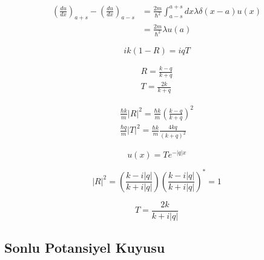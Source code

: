 \documentclass[a4paper,12pt, twoside]{article}
\begin{document}
\begin{equation}
\begin{aligned} \left( \frac { d u } { d x } \right) _ { a + s } - \left( \frac { d u } { d x } \right) _ { a - s } & = \frac { 2 m } { \hbar ^ { 2 } } \int _ { a - s } ^ { a + s } d x \lambda \delta ( x - a ) u ( x ) \\ & = \frac { 2 m } { \hbar ^ { 2 } } \lambda u ( a ) \end{aligned}
\end{equation}


\begin{equation}
i k ( 1 - R ) = i q T
\end{equation}


\begin{equation}
\begin{array} { l } { R = \frac { k - q } { k + q } } \\ { T = \frac { 2 k } { k + q } } \end{array}
\end{equation}


\begin{equation}
\begin{array} { l } { \frac { \hbar k } { m } | R | ^ { 2 } = \frac { \hbar k } { m } \left( \frac { k - q } { k + q } \right) ^ { 2 } } \\ { \frac { \hbar q } { m } | T | ^ { 2 } = \frac { \hbar k } { m } \frac { 4 k q } { ( k + q ) ^ { 2 } } } \end{array}
\end{equation}


\begin{equation}
u ( x ) = T e ^ { - | q | x }
\end{equation}


\begin{equation}
| R | ^ { 2 } = \left( \frac { k - i | q | } { k + i | q | } \right) \left( \frac { k - i | q | } { k + i | q | } \right) ^ { * } = 1
\end{equation}


\begin{equation}
T = \frac { 2 k } { k + i | q | }
\end{equation}


\subsection{Sonlu Potansiyel Kuyusu}

\newpage
\renewcommand\refname{Kaynaklar}
{}
 
\end{document}
